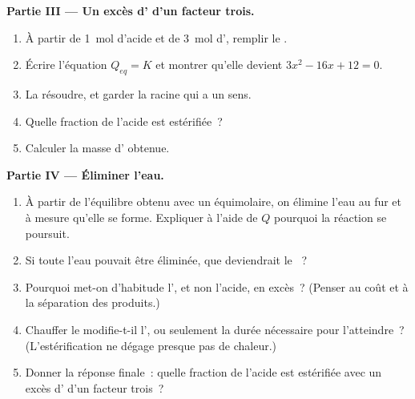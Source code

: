 \begin{problem}
\medskip
\noindent\textbf{Partie III --- Un excès d' d'un facteur trois.}
\begin{enumerate}[resume]
  \item À partir de \qty{1}{mol} d'acide et de \qty{3}{mol} d',
        remplir le .
  \item Écrire l'équation $Q_{eq} = K$ et montrer qu'elle devient
        $3x^2 - 16x + 12 = 0$.
  \item La résoudre, et garder la racine qui a un sens.
  \item Quelle fraction de l'acide est estérifiée~?
  \item Calculer la masse d' obtenue.
\end{enumerate}

\medskip
\noindent\textbf{Partie IV --- Éliminer l'eau.}
\begin{enumerate}[resume]
  \item À partir de l'équilibre obtenu avec un  équimolaire, on
        élimine l'eau au fur et à mesure qu'elle se forme. Expliquer à
        l'aide de $Q$ pourquoi la réaction se poursuit.
  \item Si toute l'eau pouvait être éliminée, que deviendrait le
        ~?
  \item Pourquoi met-on d'habitude l', et non l'acide, en excès~?
        (Penser au coût et à la séparation des produits.)
  \item Chauffer le  modifie-t-il l', ou seulement la
        durée nécessaire pour l'atteindre~? (L'estérification ne dégage
        presque pas de chaleur.)
  \item Donner la réponse finale~: quelle fraction de l'acide est
        estérifiée avec un excès d' d'un facteur trois~?
\end{enumerate}
\end{problem}
